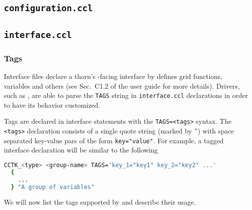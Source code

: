 \subsection{\texttt{configuration.ccl}}


\subsection{\texttt{interface.ccl}}

\subsubsection{Tags}

Interface files declare a thorn's \Cactus-facing interface by defines grid functions, variables and others (see Sec.~C1.2 of the \Cactus user guide for more details). Drivers, such as \CarpetX, are able to parse the \texttt{TAGS} string in \texttt{interface.ccl} declarations in order to have its behavior customized.

Tags are declared in interface statements with the \texttt{TAGS=<tags>} syntax. The \texttt{<tags>} declaration consists of a single quote string (marked by \texttt{'}) with space separated key-value pars of the form \texttt{key="value"}. For example, a tagged interface declaration will be similar to the following
%
\begin{lstlisting}[language=bash]
  CCTK_<type> <group-name> TAGS='key_1="key1" key_2="key2" ...'
  {
    ...
  } "A group of variables"
\end{lstlisting}

We will now list the tags supported by \CarpetX\space and describe their usage.

